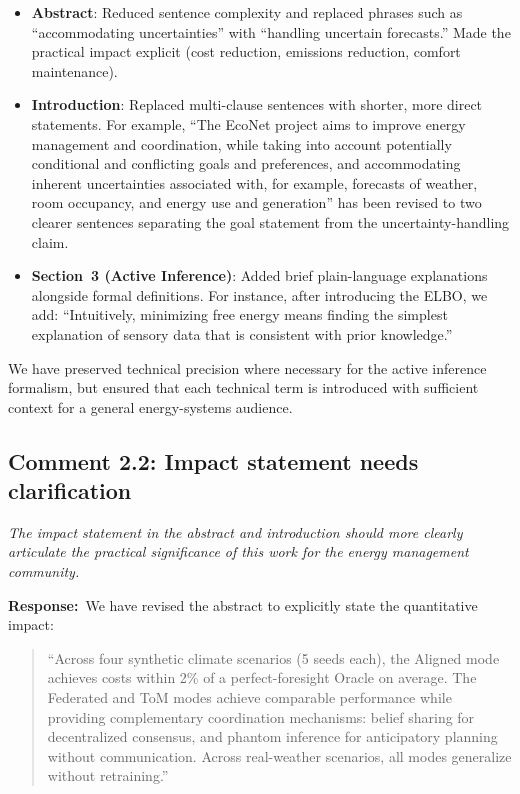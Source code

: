 \documentclass[11pt]{article}
\newcommand{\reviewercomment}[1]{\textit{#1}}
\newcommand{\response}{\textbf{Response:}\ }
\begin{document}
\begin{itemize}
    \item \textbf{Abstract}: Reduced sentence complexity and replaced phrases such as ``accommodating uncertainties'' with ``handling uncertain forecasts.'' Made the practical impact explicit (cost reduction, emissions reduction, comfort maintenance).
    \item \textbf{Introduction}: Replaced multi-clause sentences with shorter, more direct statements. For example, ``The EcoNet project aims to improve energy management and coordination, while taking into account potentially conditional and conflicting goals and preferences, and accommodating inherent uncertainties associated with, for example, forecasts of weather, room occupancy, and energy use and generation'' has been revised to two clearer sentences separating the goal statement from the uncertainty-handling claim.
    \item \textbf{Section~3 (Active Inference)}: Added brief plain-language explanations alongside formal definitions. For instance, after introducing the ELBO, we add: ``Intuitively, minimizing free energy means finding the simplest explanation of sensory data that is consistent with prior knowledge.''
\end{itemize}

We have preserved technical precision where necessary for the active inference formalism, but ensured that each technical term is introduced with sufficient context for a general energy-systems audience.

\subsection*{Comment 2.2: Impact statement needs clarification}

\reviewercomment{The impact statement in the abstract and introduction should more clearly articulate the practical significance of this work for the energy management community.}

\response We have revised the abstract to explicitly state the quantitative impact:

\begin{quote}
``Across four synthetic climate scenarios (5 seeds each), the Aligned mode achieves costs within 2\% of a perfect-foresight Oracle on average. The Federated and ToM modes achieve comparable performance while providing complementary coordination mechanisms: belief sharing for decentralized consensus, and phantom inference for anticipatory planning without communication. Across real-weather scenarios, all modes generalize without retraining.''
\end{quote}
\end{document}
